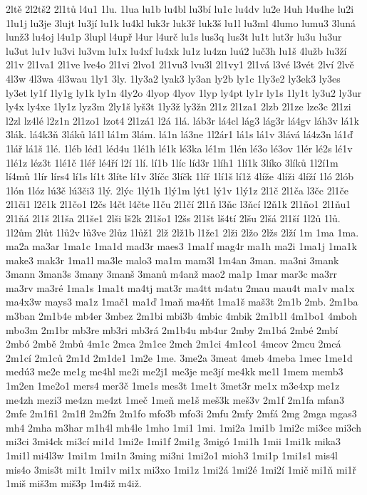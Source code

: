 {2ltě
2l2tš2
2l1tů
l4u1
1lu.
1lua
lu1b
lu4bl
lu3bí
lu1c
lu4dv
lu2e
l4uh
l4u4he
lu2i
1lu1j
lu3je
3lujt
lu3jí
lu1k
lu4kl
luk3r
luk3ř
luk3š
lu1l
lu3ml
4lumo
lumu3
3luná
lunž3
lu4oj
l4u1p
3lupl
l4upř
l4ur
l4urč
lu1s
lus3q
lus3t
lu1t
lut3r
lu3u
lu3ur
lu3ut
lu1v
lu3vi
lu3vm
lu1x
lu4xf
lu4xk
lu1z
lu4zn
luú2
luč3h
lu1š
4lužb
lu3ží
2l1v
2l1va1
2l1ve
lve4o
2l1vi
2lvo1
2l1vu3
lvu3l
2l1vy1
2l1vá
l3vé
l3vét
2lví
2lvě
4l3w
4l3wa
4l3wau
1ly1
3ly.
1ly3a2
lyak3
ly3an
ly2b
ly1c
1ly3e2
ly3ek3
ly3es
ly3et
ly1f
1ly1g
ly1k
ly1n
4ly2o
4lyop
4lyov
1lyp
ly4pt
ly1r
ly1s
1ly1t
ly3u2
ly3ur
ly4x
ly4xe
1ly1z
lyz3m
2ly1š
lyš3t
1ly3ž
ly3žn
2l1z
2l1za1
2lzb
2l1ze
lze3c
2l1zi
l2zl
lz4lé
l2z1n
2l1zo1
lzot4
2l1zá1
l2á
1lá.
láb3r
lá4cl
lág3
lág3r
lá4gv
láh3v
lá1k
3lák.
lá4k3ň
3láků
lá1l
lá1m
3lám.
lá1n
lá3ne
1l2ár1
lá1s
lá1v
3lává
lá4z3n
lá1ď
1lář
lá1š
1lé.
1léb
léd1
léd4u
1lé1h
lé1k
lé3ka
lé1m
1lén
lé3o
lé3ov
1lér
lé2s
lé1v
1lé1z
léz3t
1lé1č
1léř
lé4ří
l2í
1lí.
lí1b
1líc
líd3r
1líh1
1lí1k
3líko
3líků
1l2í1m
lí4mů
1lír
lírs4
lí1s
lí1t
3líte
lí1v
3líčc
3líčk
1líř
1lí1š
lí1ž
4líže
4líži
4líží
1ló
2lób
1lón
1lóz
lú3č
lú3či3
1lý.
2lýc
1lý1h
1lý1m
lýt1
lý1v
1lý1z
2l1č
2l1ča
l3čc
2l1če
2l1či1
l2č1k
2l1čo1
l2čs
l4čt
l4čte
l1ču
2l1čí
2l1ň
l3ňc
l3ňcí
l2ň1k
2l1ňo1
2l1ňu1
2l1ňá
2l1š
2l1ša
2l1še1
2lši
lš2k
2l1šo1
l2šs
2l1št
lš4tí
2lšu
2lšá
2l1ší
1l2ů
1lů.
1l2ům
2lůt
1lů2v
lů3ve
2lůz
1lůž1
2lž
2lž1b
l1že1
2lži
2lžo
2lžs
2lží
1m
1ma
1ma.
ma2a
ma3ar
1ma1c
1ma1d
mad3r
maes3
1ma1f
mag4r
ma1h
ma2i
1ma1j
1ma1k
make3
mak3r
1ma1l
ma3le
malo3
ma1m
mam3l
1m4an
3man.
ma3ni
3mank
3mann
3man3s
3many
3manš
3manů
m4anž
mao2
ma1p
1mar
mar3c
ma3rr
ma3rv
ma3ré
1ma1s
1ma1t
ma4tj
mat3r
ma4tt
m4atu
2mau
mau4t
ma1v
ma1x
ma4x3w
mays3
ma1z
1mač1
ma1ď
1maň
ma4ňt
1ma1š
maš3t
2m1b
2mb.
2m1ba
m3ban
2m1b4e
mb4er
3mbez
2m1bi
mbi3b
4mbic
4mbik
2m1b1l
4m1bo1
4mboh
mbo3m
2m1br
mb3re
mb3ri
mb3rá
2m1b4u
mb4ur
2mby
2m1bá
2mbé
2mbí
2mbó
2mbě
2mbů
4m1c
2mca
2m1ce
2mch
2m1ci
4m1co1
4mcov
2mcu
2mcá
2m1cí
2m1ců
2m1d
2m1de1
1m2e
1me.
3me2a
3meat
4meb
4meba
1mec
1me1d
medú3
me2e
me1g
me4hl
me2i
me2j1
me3je
me3jí
me4kk
me1l
1mem
memb3
1m2en
1me2o1
mers4
mer3č
1me1s
mes3t
1me1t
3met3r
me1x
m3e4xp
me1z
me4zh
mezi3
me4zn
me4zt
1meč
1meň
me1š
meš3k
meš3v
2m1f
2m1fa
mfan3
2mfe
2m1fi1
2m1fl
2m2fn
2m1fo
mfo3b
mfo3i
2mfu
2mfy
2mfá
2mg
2mga
mgas3
mh4
2mha
m3har
m1h4l
mh4le
1mho
1mi1
1mi.
1mi2a
1mi1b
1mi2c
mi3ce
mi3ch
mi3ci
3mi4ck
mi3cí
mi1d
1mi2e
1mi1f
2mi1g
3migó
1mi1h
1mii
1mi1k
mika3
1mi1l
mi4l3w
1mi1m
1mi1n
3ming
mi3ni
1mi2o1
mioh3
1mi1p
1mi1s1
mis4l
mis4o
3mis3t
mi1t
1mi1v
mi1x
mi3xo
1mi1z
1mi2á
1mi2é
1mi2í
1mič
mi1ň
mi1ř
1miš
miš3m
miš3p
1m4iž
m4iž.
}
